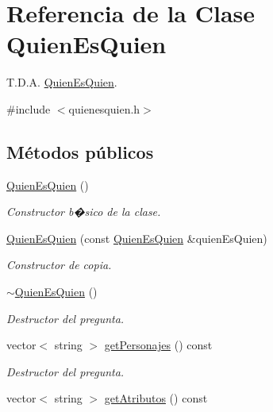 \hypertarget{classQuienEsQuien}{}\section{Referencia de la Clase Quien\+Es\+Quien}
\label{classQuienEsQuien}


T.\+D.\+A. \hyperlink{classQuienEsQuien}{Quien\+Es\+Quien}.  




{\ttfamily \#include $<$quienesquien.\+h$>$}

\subsection*{Métodos públicos}
\begin{DoxyCompactItemize}
\item 
\hyperlink{classQuienEsQuien_a2942486f1ff134fec70e5d21d7916a2e}{Quien\+Es\+Quien} ()\hypertarget{classQuienEsQuien_a2942486f1ff134fec70e5d21d7916a2e}{}\label{classQuienEsQuien_a2942486f1ff134fec70e5d21d7916a2e}

\begin{DoxyCompactList}\small\item\em Constructor b�sico de la clase. \end{DoxyCompactList}\item 
\hyperlink{classQuienEsQuien_a362b7513eba83170d18d98946bc01d87}{Quien\+Es\+Quien} (const \hyperlink{classQuienEsQuien}{Quien\+Es\+Quien} \&quien\+Es\+Quien)
\begin{DoxyCompactList}\small\item\em Constructor de copia. \end{DoxyCompactList}\item 
\hyperlink{classQuienEsQuien_ade80093df9e450c6e37e8992da112a70}{$\sim$\+Quien\+Es\+Quien} ()\hypertarget{classQuienEsQuien_ade80093df9e450c6e37e8992da112a70}{}\label{classQuienEsQuien_ade80093df9e450c6e37e8992da112a70}

\begin{DoxyCompactList}\small\item\em Destructor del pregunta. \end{DoxyCompactList}\item 
vector$<$ string $>$ \hyperlink{classQuienEsQuien_a7bd7357352e83f0375d95ea9ee16a411}{get\+Personajes} () const \hypertarget{classQuienEsQuien_a7bd7357352e83f0375d95ea9ee16a411}{}\label{classQuienEsQuien_a7bd7357352e83f0375d95ea9ee16a411}

\begin{DoxyCompactList}\small\item\em Destructor del pregunta. \end{DoxyCompactList}\item 
vector$<$ string $>$ \hyperlink{classQuienEsQuien_acf90599384c56b6c9c4cd362f07810f3}{get\+Atributos} () const \hypertarget{classQuienEsQuien_acf90599384c56b6c9c4cd362f07810f3}{}\label{classQuienEsQuien_acf90599384c56b6c9c4cd362f07810f3}


\end{DoxyCompactItemize}
